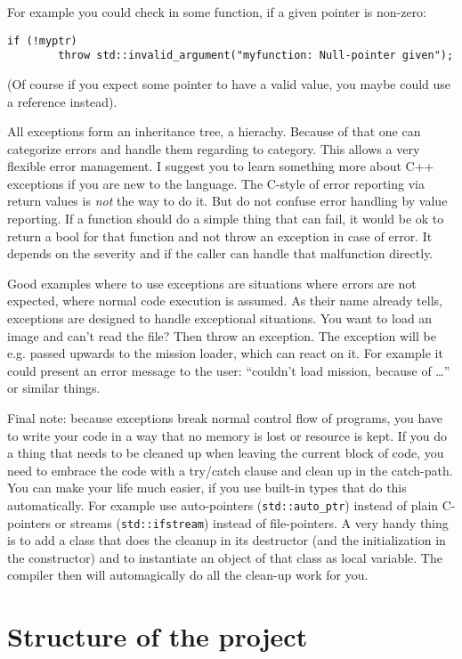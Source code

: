\documentclass{report}
\begin{document}
For example you could check in some function, if a given pointer is
non-zero:
\begin{verbatim}
if (!myptr)
        throw std::invalid_argument("myfunction: Null-pointer given");
\end{verbatim}
(Of course if you expect some pointer to have a valid value, you maybe
could use a reference instead).

All exceptions form an inheritance tree, a hierachy. Because of that one
can categorize errors and handle them regarding to category. This allows
a very flexible error management. I suggest you to learn something more
about C++ exceptions if you are new to the language. The C-style of
error reporting via return values is \emph{not} the way to do it. But do
not confuse error handling by value reporting. If a function should do a
simple thing that can fail, it would be ok to return a bool for that
function and not throw an exception in case of error. It depends on the
severity and if the caller can handle that malfunction directly.

Good examples where to use exceptions are situations where errors are
not expected, where normal code execution is assumed. As their name
already tells, exceptions are designed to handle exceptional situations.
You want to load an image and can't read the file? Then throw an
exception. The exception will be e.g. passed upwards to the mission
loader, which can react on it. For example it could present an error
message to the user: ``couldn't load mission, because of \ldots'' or
similar things.

Final note: because exceptions break normal control flow of programs,
you have to write your code in a way that no memory is lost or resource
is kept. If you do a thing that needs to be cleaned up when leaving the
current block of code, you need to embrace the code with a try/catch
clause and clean up in the catch-path. You can make your life much
easier, if you use built-in types that do this automatically. For
example use auto-pointers (\texttt{std::auto\_ptr}) instead of plain
C-pointers or streams (\texttt{std::ifstream}) instead of file-pointers.
A very handy thing is to add a class that does the cleanup in its
destructor (and the initialization in the constructor) and to
instantiate an object of that class as local variable. The compiler then
will automagically do all the clean-up work for you.


\section{Structure of the project}
\end{document}
